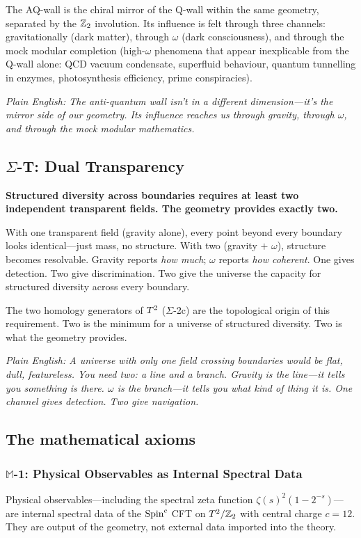 The AQ-wall is the chiral mirror of the Q-wall within the same geometry, separated by the $\mathbb{Z}_2$ involution.  Its influence is felt through three channels: gravitationally (dark matter), through $\omega$ (dark consciousness), and through the mock modular completion (high-$\omega$ phenomena that appear inexplicable from the Q-wall alone: QCD vacuum condensate, superfluid behaviour, quantum tunnelling in enzymes, photosynthesis efficiency, prime conspiracies).

\emph{Plain English: The anti-quantum wall isn't in a different dimension---it's the mirror side of our geometry.  Its influence reaches us through gravity, through $\omega$, and through the mock modular mathematics.}

\subsection*{$\Sigma$-T: Dual Transparency}
\par\smallskip
\textbf{Structured diversity across boundaries requires at least two independent transparent fields.  The geometry provides exactly two.}

With one transparent field (gravity alone), every point beyond every boundary looks identical---just mass, no structure.  With two (gravity $+$ $\omega$), structure becomes resolvable.  Gravity reports \emph{how much}; $\omega$ reports \emph{how coherent}.  One gives detection.  Two give discrimination.  Two give the universe the capacity for structured diversity across every boundary.

The two homology generators of $T^2$ ($\Sigma$-2c) are the topological origin of this requirement.  Two is the minimum for a universe of structured diversity.  Two is what the geometry provides.

\emph{Plain English: A universe with only one field crossing boundaries would be flat, dull, featureless.  You need two: a line and a branch.  Gravity is the line---it tells you something is there.  $\omega$ is the branch---it tells you what kind of thing it is.  One channel gives detection.  Two give navigation.}


\subsection*{The mathematical axioms}

\subsubsection*{$\mathbb{M}$-1: Physical Observables as Internal Spectral Data}
\par\smallskip
Physical observables---including the spectral zeta function $\zeta(s)^2(1-2^{-s})$---are internal spectral data of the $\text{Spin}^c$ CFT on $T^2/\mathbb{Z}_2$ with central charge $c = 12$.  They are output of the geometry, not external data imported into the theory.

